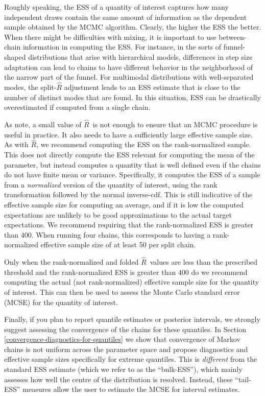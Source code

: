 \documentclass[american,]{article}
\newcommand{\Rhat}{$\widehat{R}$}
\theoremstyle{definition}
\begin{document}
Roughly speaking, the ESS of a quantity of interest captures how many
independent draws contain the same amount of information as the dependent 
sample obtained by the MCMC algorithm. Clearly, the higher the ESS the better.
When there might be difficulties with mixing, it is important to use between-chain 
information in computing the ESS. For instance, in the sorts of
funnel-shaped distributions that arise with hierarchical models, differences 
in step size adaptation can lead to chains to have
different behavior in the neighborhood of the narrow part of the funnel. For multimodal
distributions with well-separated modes, the split-\(\widehat{R}\)
adjustment leads to an ESS estimate that is close to the number of
distinct modes that are found. 
In this situation, ESS can be drastically overestimated if computed from a single chain.

As \citet{vats2018revisiting} note, a small value of \Rhat\ is not enough to ensure 
that an MCMC procedure is useful in practice. It also needs to have a sufficiently
large effective sample size. As with \Rhat, we 
recommend computing the ESS on the rank-normalized sample. This does not
directly compute the ESS relevant for computing the mean of the parameter, but 
instead computes a quantity that is well defined even if the chains do not 
have finite mean or variance.  Specifically, it computes the ESS of a sample
from a \emph{normalized} version of the quantity of interest, using the rank transformation followed by the normal inverse-cdf. This is still indicative of the effective sample size for computing an average, and if it is low the computed
expectations are unlikely to be good approximations to the actual
target expectations.  We recommend requiring that the rank-normalized ESS is 
 greater than $400$. When running four chains, this corresponds to having
a rank-normalized effective sample size of at least 50 per split chain.

Only when the rank-normalized and folded \Rhat\ values are less than the
prescribed threshold and the rank-normalized ESS is greater than $400$ do we recommend
computing the actual (not rank-normalized) effective sample size for the 
quantity of interest. This can then be used to assess the Monte Carlo standard error (MCSE) for the quantity
of interest.

Finally, if you plan to report quantile estimates or posterior intervals, we 
strongly suggest assessing the convergence of the chains for these quantiles.
In Section \ref{convergence-diagnostics-for-quantiles} we show that
convergence of Markov chains is not uniform across the parameter space
and propose diagnostics and effective sample sizes specifically for extreme 
quantiles. This is \emph{different} from the standard ESS estimate (which 
we refer to as the ``bulk-ESS''), which mainly assesses how well
the centre of the distribution is resolved. Instead, these ``tail-ESS''
measures allow the user to estimate the MCSE for interval estimates.
\end{document}
